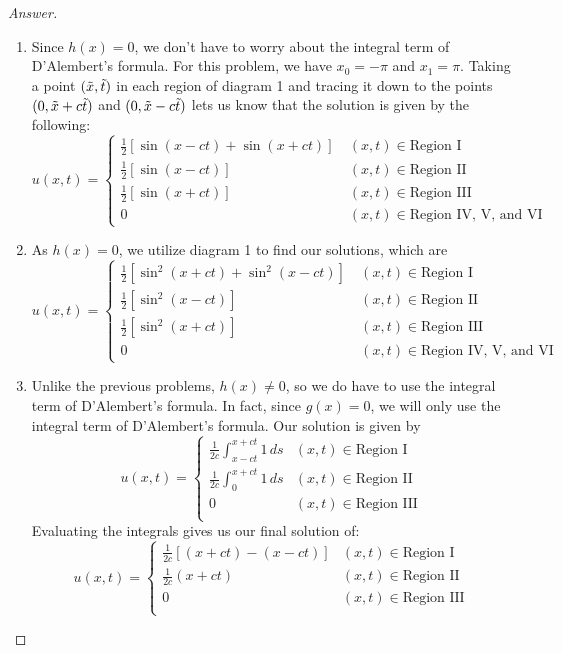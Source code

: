 \documentclass{article}
\theoremstyle{definition}
\renewcommand\qedsymbol{$\blacksquare$}
\newenvironment{ans}{\begin{proof}[Answer]\renewcommand{\qedsymbol}{}}{\end{proof}}
\begin{document}
\begin{ans}
\begin{enumerate}[(1), start = 7, resume*=answers]
    \item Since $h(x) = 0$, we don't have to worry about the integral term of D'Alembert's formula. For this problem, we have $x_0 = -\pi$ and $x_1 = \pi$. Taking a point $(\Tilde{x}, \Tilde{t})$ in each region of diagram 1 and tracing it down to the points $(0, \Tilde{x} + c\Tilde{t})$ and $(0, \Tilde{x} - c\Tilde{t})$ lets us know that the solution is given by the following:
        \[\boxed{u(x,t) = \begin{cases}
        \frac{1}{2} \left[ \sin(x-ct) + \sin(x+ct) \right]\ & (x,t)\in\text{Region I}\\
        \frac{1}{2} \left[ \sin(x-ct) \right] & (x,t)\in\text{Region II}\\
        \frac{1}{2} \left[ \sin(x+ct) \right] & (x,t) \in \text{Region III}\\
        0 & (x,t) \in \text{Region IV, V, and VI}
    \end{cases}}\]

    \item As $h(x) = 0$, we utilize diagram 1 to find our solutions, which are
    \[\boxed{u(x,t) = \begin{cases}
        \frac{1}{2} \left[ \sin^2{(x+ct)} + \sin^2{(x-ct)} \right]\ & (x,t)\in\text{Region I}\\
        \frac{1}{2} \left[ \sin^2{(x-ct)} \right] & (x,t)\in\text{Region II}\\
        \frac{1}{2} \left[ \sin^2{(x+ct)} \right] & (x,t) \in \text{Region III}\\
        0 & (x,t) \in \text{Region IV, V, and VI}
    \end{cases}}\]

    \item Unlike the previous problems, $h(x)\neq 0$, so we do have to use the integral term of D'Alembert's formula. In fact, since $g(x) = 0$, we will only use the integral term of D'Alembert's formula. Our solution is given by
    \[u(x,t) = \begin{cases}
        \frac{1}{2c} \int_{x-ct}^{x+ct}1\, ds & (x,t)\in\text{Region I}\\
        \frac{1}{2c} \int_{0}^{x+ct}1\, ds & (x,t)\in\text{Region II}\\
        0 & (x,t) \in \text{Region III}\\
    \end{cases}\]
    Evaluating the integrals gives us our final solution of:
    \[\boxed{u(x,t) = \begin{cases}
        \frac{1}{2c}\left[(x+ct) - (x-ct)\right] & (x,t)\in\text{Region I}\\
        \frac{1}{2c}(x+ct) & (x,t)\in\text{Region II}\\
        0 & (x,t) \in \text{Region III}\\
    \end{cases}}\]


\end{enumerate}
\end{ans}
\end{document}
